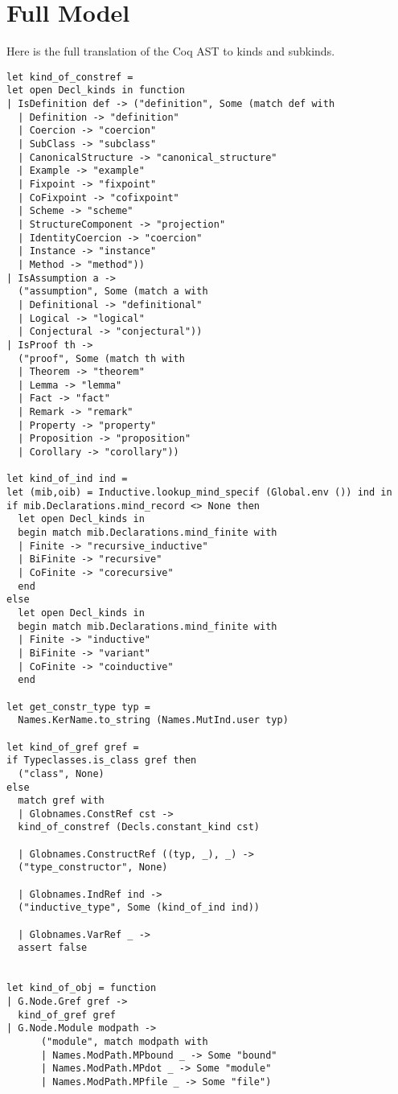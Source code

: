 \chapter{Full Model}\label{chapter:fullmodel}

Here is the full translation of the Coq AST to kinds and subkinds.

\begin{verbatim}
let kind_of_constref =
let open Decl_kinds in function
| IsDefinition def -> ("definition", Some (match def with
  | Definition -> "definition"
  | Coercion -> "coercion"
  | SubClass -> "subclass"
  | CanonicalStructure -> "canonical_structure"
  | Example -> "example"
  | Fixpoint -> "fixpoint"
  | CoFixpoint -> "cofixpoint"
  | Scheme -> "scheme"
  | StructureComponent -> "projection"
  | IdentityCoercion -> "coercion"
  | Instance -> "instance"
  | Method -> "method"))
| IsAssumption a ->
  ("assumption", Some (match a with
  | Definitional -> "definitional"
  | Logical -> "logical"
  | Conjectural -> "conjectural"))
| IsProof th ->
  ("proof", Some (match th with
  | Theorem -> "theorem"
  | Lemma -> "lemma"
  | Fact -> "fact"
  | Remark -> "remark"
  | Property -> "property"
  | Proposition -> "proposition"
  | Corollary -> "corollary"))

let kind_of_ind ind =
let (mib,oib) = Inductive.lookup_mind_specif (Global.env ()) ind in
if mib.Declarations.mind_record <> None then
  let open Decl_kinds in
  begin match mib.Declarations.mind_finite with
  | Finite -> "recursive_inductive"
  | BiFinite -> "recursive"
  | CoFinite -> "corecursive"
  end
else
  let open Decl_kinds in
  begin match mib.Declarations.mind_finite with
  | Finite -> "inductive"
  | BiFinite -> "variant"
  | CoFinite -> "coinductive"
  end

let get_constr_type typ =
  Names.KerName.to_string (Names.MutInd.user typ)

let kind_of_gref gref = 
if Typeclasses.is_class gref then
  ("class", None)
else
  match gref with
  | Globnames.ConstRef cst ->
  kind_of_constref (Decls.constant_kind cst)

  | Globnames.ConstructRef ((typ, _), _) -> 
  ("type_constructor", None)

  | Globnames.IndRef ind -> 
  ("inductive_type", Some (kind_of_ind ind))

  | Globnames.VarRef _ ->
  assert false


let kind_of_obj = function
| G.Node.Gref gref -> 
  kind_of_gref gref
| G.Node.Module modpath ->
      ("module", match modpath with
      | Names.ModPath.MPbound _ -> Some "bound"
      | Names.ModPath.MPdot _ -> Some "module"
      | Names.ModPath.MPfile _ -> Some "file")
\end{verbatim}

